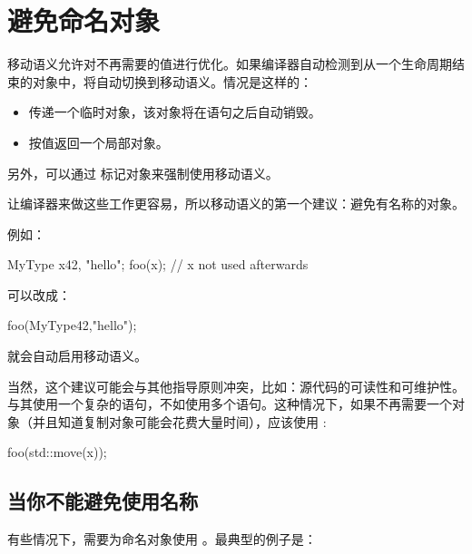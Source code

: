 \section{避免命名对象}
移动语义允许对不再需要的值进行优化。如果编译器自动检测到从一个生命周期结束的对象中，将自动切换到移动语义。情况是这样的：

\begin{itemize}
	\item 传递一个临时对象，该对象将在语句之后自动销毁。
	\item 按值返回一个局部对象。
\end{itemize}

另外，可以通过  标记对象来强制使用移动语义。

让编译器来做这些工作更容易，所以移动语义的第一个建议：避免有名称的对象。

例如：

\begin{cppcode}
MyType x{42, "hello"};
foo(x); // x not used afterwards
\end{cppcode}

可以改成：

\begin{cppcode}
foo(MyType{42,"hello"});
\end{cppcode}

就会自动启用移动语义。

当然，这个建议可能会与其他指导原则冲突，比如：源代码的可读性和可维护性。与其使用一个复杂的语句，不如使用多个语句。这种情况下，如果不再需要一个对象（并且知道复制对象可能会花费大量时间），应该使用 :

\begin{cppcode}
foo(std::move(x));
\end{cppcode}

\subsection{当你不能避免使用名称}

有些情况下，需要为命名对象使用 。最典型的例子是：

